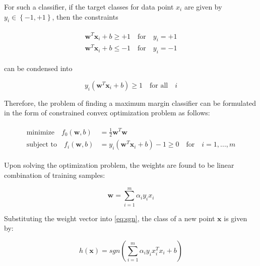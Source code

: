 For such a classifier, if the target classes for data point $x_i$ are given by $y_i \in \left\lbrace -1, +1 \right\rbrace$, then the constraints

\begin{align}
\begin{aligned}
\mathbf{w}^{T}\mathbf{x}_i + b \geq +1 \quad \text{for} \quad y_i = +1 \\
\mathbf{w}^{T}\mathbf{x}_i + b \leq -1 \quad \text{for} \quad y_i = -1
\end{aligned}
\end{align}

can be condensed into 

$$
y_i (\mathbf{w}^{T}\mathbf{x}_i + b) \geq 1 \quad \text{for all} \quad i
$$

Therefore, the problem of finding a maximum margin classifier can be formulated in the form of constrained convex optimization problem as follows:

\begin{align}
\begin{aligned}
\text{minimize} \quad f_0(\mathbf{w},b) &= \frac{1}{2} \mathbf{w}^{T} \mathbf{w} \\
\text{subject to} \quad f_i(\mathbf{w},b) &= y_i (\mathbf{w}^{T}\mathbf{x}_i + b) -1 \geq 0 \quad \text{for} \quad i = 1,...,m
\end{aligned}
\end{align}

Upon solving the optimization problem, the weights are found to be linear combination of training samples:

$$
\mathbf{w} = \sum^{m}_{i=1} \alpha_i y_i x_i
$$

Substituting the weight vector into \ref{eq:sgn}, the class of a new point $\mathbf{x}$ is given by:

$$
h(\mathbf{x}) = sgn(\sum^{m}_{i=1} \alpha_i y_i x_i^{T} x_i + b)
$$

